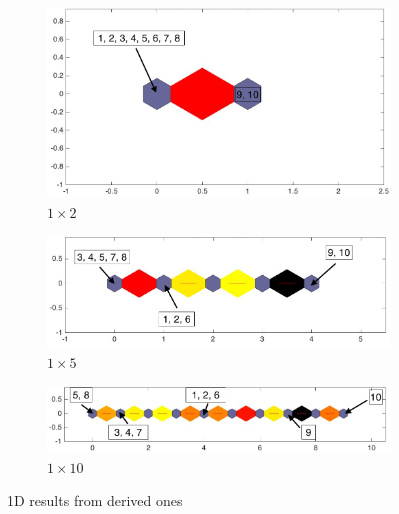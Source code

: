             \begin{figure}
                \begin{subfigure}[b]{0.5\textwidth}
                    \centering
                    \includegraphics[width=\textwidth]{../images/M31/derived_ones/dist1by2.jpeg}
                    \caption{$1\times2$}
                    \label{fig: 1by2derived}
                \end{subfigure}
                \hfill
                \begin{subfigure}[b]{0.5\textwidth}
                    \includegraphics[width=\textwidth]{../images/M31/derived_ones/dist1by5.jpeg}
                    \caption{$1\times5$}
                    \label{fig: 1by5derived}
                \end{subfigure}
                \hfill
                \hfill
                \begin{subfigure}[b]{0.5\textwidth}
                    \includegraphics[width=\textwidth]{../images/M31/derived_ones/dist1by10.jpeg}
                    \caption{$1\times10$}
                    \label{fig: 1by10derived}
                \end{subfigure}
                \caption{1D results from derived ones}
                \label{fig: 1Dsoms}
            \end{figure}